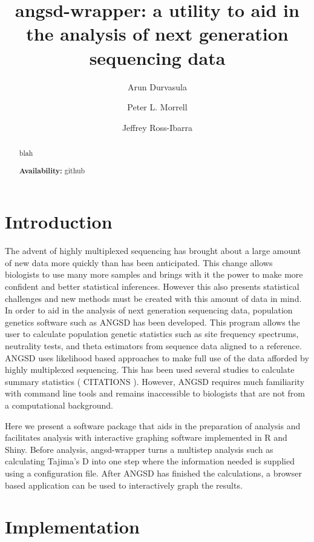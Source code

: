 \documentclass[12pt]{article}
\title{angsd-wrapper: a utility to aid in the analysis of next generation sequencing data}
\author[1]{Arun Durvasula}
\author[2]{Peter L. Morrell}
\author[1,3]{Jeffrey Ross-Ibarra}
\affil[1]{Department of Plant Sciences, University of California Davis}
\affil[2]{Department of Agronomy and Plant Genetics, University of Minnesota}
\affil[3]{Center for Population Biology and Genome Center, University of California Davis}
\date{}
\begin{document}
\maketitle

\begin{abstract}
blah

\textbf{Availability:} github
\end{abstract}

\section*{Introduction}
The advent of highly multiplexed sequencing has brought about a large amount of new data more quickly than has been anticipated. 
This change allows biologists to use many more samples and brings with it the power to make more confident and better statistical inferences.  %
However this also presents statistical challenges and new methods must be created with this amount of data in mind. 
In order to aid in the analysis of next generation sequencing data, population genetics software such as ANGSD has been developed. 
This program allows the user to calculate population genetic statistics such as site frequency spectrums, neutrality tests, and theta estimators from sequence data aligned to a reference. 
ANGSD uses likelihood based approaches to make full use of the data afforded by highly multiplexed sequencing. 
This has been used several studies to calculate summary statistics ( CITATIONS ). 
However, ANGSD requires much familiarity with command line tools and remains inaccessible to biologists that are not from a computational background. 

Here we present a software package that aids in the preparation of analysis and facilitates analysis with interactive graphing software implemented in R and Shiny. 
Before analysis, angsd-wrapper turns a multistep analysis such as calculating Tajima's D into one step where the information needed is supplied using a configuration file. 
After ANGSD has finished the calculations, a browser based application can be used to interactively graph the results.

\section*{Implementation}
\end{document}
